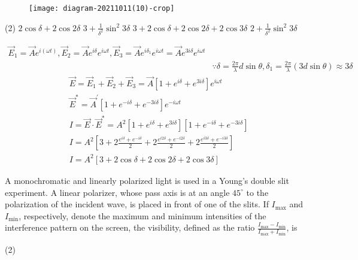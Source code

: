 \begin{enumerate}
\begin{minipage}{\textwidth}
\begin{figure}[H]
		\centering
		\texttt{[image: diagram-20211011(10)-crop]}
	\end{figure}
\end{minipage}
\begin{tasks}(2)
	\task[\textbf{A.}] $2 \cos \delta+2 \cos 2 \delta$
	\task[\textbf{B.}]$3+\frac{1}{\delta^{2}} \sin ^{2} 3 \delta$
	\task[\textbf{C.}] $3+2 \cos \delta+2 \cos 2 \delta+2 \cos 3 \delta$
	\task[\textbf{D.}]$2+\frac{1}{\delta^{2}} \sin ^{2} 3 \delta$
\end{tasks}
\begin{answer}
	$$	\begin{aligned}
	\vec{E}_{1}=\vec{A} e^{i(\omega t)}, \vec{E}_{2}=\vec{A} e^{i \delta} e^{i \omega t}, \vec{E}_{3}=\vec{A} e^{i \delta_{1}} e^{i \omega t}=\vec{A} e^{3 i \delta} e^{i \omega t} \\
	&\because \delta=\frac{2 \pi}{\lambda} d \sin \theta, \delta_{1}=\frac{2 \pi}{\lambda}(3 d \sin \theta) \approx 3 \delta
	\end{aligned}$$
	$$\begin{aligned}
	&\vec{E}=\vec{E}_{1}+\vec{E}_{2}+\vec{E}_{3}=\vec{A}\left[1+e^{i \delta}+e^{3 i \delta}\right] e^{i \omega t} \\
	&\vec{E}^{*}=\vec{A}^{\prime}\left[1+e^{-i \delta}+e^{-3 i \delta}\right] e^{-i \omega t} \\
	&I=\vec{E} \cdot \vec{E}^{*}=A^{2}\left[1+e^{i \delta}+e^{3 i \delta}\right]\left[1+e^{-i \delta}+e^{-3 i \delta}\right] \\
	&I=A^{2}\left[3+2 \frac{e^{i \delta}+e^{-i \delta}}{2}+2 \frac{e^{i 2 \delta}+e^{-i 2 \delta}}{2}+2 \frac{e^{i 3 \delta}+e^{-i 3 \delta}}{2}\right] \\
	&I=A^{2}[3+2 \cos \delta+2 \cos 2 \delta+2 \cos 3 \delta]
	\end{aligned}$$
\end{answer}
\begin{minipage}{\textwidth}
	\item A monochromatic and linearly polarized light is used in a Young's double slit experiment.
	A linear polarizer, whose pass axis is at an angle $45^{\circ}$ to the polarization of the incident
	wave, is placed in front of one of the slits. If $I_{\max }$ and $I_{\min }$, respectively, denote the maximum and minimum intensities of the interference pattern on the screen, the visibility, defined as the ratio $\frac{I_{\max }-I_{\min }}{I_{\max }+I_{\min }}$, is
\end{minipage}
\begin{tasks}(2)

\end{tasks}
\end{enumerate}
